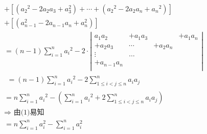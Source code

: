 \documentclass[fontset=windows]{article}
\begin{document}
\begin{figure}[!htb]
\begin{minipage}[t]{0.5\linewidth}
\begin{align}
        &+\left[\left(a_{2}{ }^{2}-2 a_{2} a_{3}+a_{3}^{2}\right)+\cdots+\left(a_{2}{ }^{2}-2 a_{2} a_{n}+a_{n}{ }^{2}\right)\right]\nonumber\\
        &+\left[\left(a_{n-1}^{2}-2 a_{n-1} a_{n}+a_{n}^{2}\right)\right]\nonumber\\
        &=(n-1) \sum\limits_{i=1}^{n} a_{i}{ }^{2}-2\cdot
        \left|
        \begin{array}{cccc}
            a_{1} a_{2} & +a_{1} a_{3} & & +a_{1} a_{n} \\
            +a_{2} a_{3} & \cdots & +a_{2} a_{n} & \\
            \vdots & \ldots & & \\
            +a_{n-1} a_{n} & & &\\
        \end{array}
        \right|\nonumber\\
        &\begin{array}{l}
        =(n-1) \sum_{i=1}^{n} a_{i}{ }^{2}-2 \sum_{1 \leq i<j \leq n}^{n} a_{i} a_{j}
        \end{array}\nonumber\\
        &=n \sum_{i=1}^{n} a_{i}{ }^{2}-\left(\sum_{i=1}^{n} a_{i}{ }^{2}+2 \sum\limits_{1 \leq i<j \leq n}^{n} a_{i} a_{j}\right)\nonumber\\
        &\Longrightarrow \text { 由(1)易知 }\nonumber \\
        &=n \sum\limits_{i=1}^{n} a_{i}^{2}-\sum_{i=1}^{n} a_{i}^{2}\nonumber
    \end{align}
    \end{minipage}
    \end{figure}
   
\end{document}

